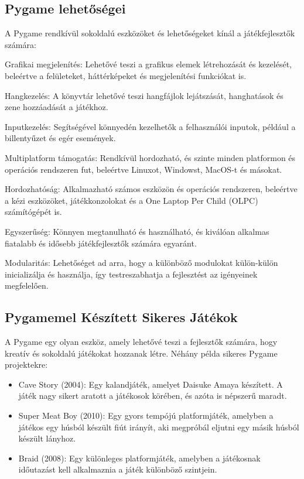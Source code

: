 \subsection{Pygame lehetőségei}
\indent \indent A Pygame rendkívül sokoldalú eszközöket és lehetőségeket kínál a játékfejlesztők számára:

Grafikai megjelenítés: Lehetővé teszi a grafikus elemek létrehozását és kezelését, beleértve a felületeket, háttérképeket és megjelenítési funkciókat is.

Hangkezelés: A könyvtár lehetővé teszi hangfájlok lejátszását, hanghatások és zene hozzáadását a játékhoz.

Inputkezelés: Segítségével könnyedén kezelhetők a felhasználói inputok, például a billentyűzet és egér események.

Multiplatform támogatás: Rendkívül hordozható, és szinte minden platformon és operációs rendszeren fut, beleértve Linuxot, Windowst, MacOS-t és másokat.

Hordozhatóság: Alkalmazható számos eszközön és operációs rendszeren, beleértve a kézi eszközöket, játékkonzolokat és a One Laptop Per Child (OLPC) számítógépét is.

Egyszerűség: Könnyen megtanulható és használható, és kiválóan alkalmas fiatalabb és idősebb játékfejlesztők számára egyaránt.

Modularitás: Lehetőséget ad arra, hogy a különböző modulokat külön-külön inicializálja és használja, így testreszabhatja a fejlesztést az igényeinek megfelelően.



\subsection{Pygamemel Készített Sikeres Játékok}
\indent \indent A Pygame egy olyan eszköz, amely lehetővé teszi a fejlesztők számára, hogy kreatív és sokoldalú játékokat hozzanak létre. Néhány példa sikeres Pygame projektekre:

\begin{itemize}

    \item Cave Story (2004): Egy kalandjáték, amelyet Daisuke Amaya készített. A játék nagy sikert aratott a játékosok körében, és azóta is népszerű maradt. \cite{CaveStory}
    \item Super Meat Boy (2010): Egy gyors tempójú platformjáték, amelyben a játékos egy húsból készült fiút irányít, aki megpróbál eljutni egy másik húsból készült lányhoz.\cite{SuperMeatBoy}
    \item Braid (2008): Egy különleges platformjáték, amelyben a játékosnak időutazást kell alkalmaznia a játék különböző szintjein.\cite{Braid}
\end{itemize}


